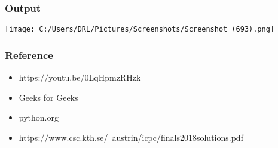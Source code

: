 \documentclass{beamer}
\begin{document}
    \begin{frame}
	\frametitle{Output}
	   \centerline{\texttt{[image: C:/Users/DRL/Pictures/Screenshots/Screenshot (693).png]}}
    \end{frame}
    \begin{frame}
    \frametitle{Reference}
    \begin{itemize}
    \item {https://youtu.be/0LqHpmzRHzk}
    \item {Geeks for Geeks}
    \item{python.org}
    \item {https://www.csc.kth.se/~austrin/icpc/finals2018solutions.pdf}
    \end{itemize}
    \end{frame}
\end{document}
